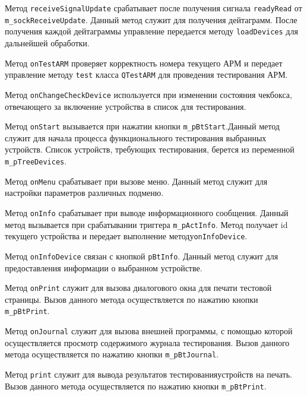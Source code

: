 \begin{enum}
	\item Метод \texttt{receiveSignalUpdate} срабатывает после получения сигнала \texttt{readyRead} от
		\texttt{m\_sockReceiveUpdate}. Данный метод служит для получения дейтаграмм. После получения каждой
		дейтаграммы управление передается методу \texttt{loadDevices} для дальнейшей обработки.

	\item Метод \texttt{onTestARM} проверяет корректность номера текущего АРМ и передает управление методу
		\texttt{test} класса \texttt{QTestARM} для проведения тестирования АРМ.

	\item Метод \texttt{onChangeCheckDevice} используется при изменении состояния чекбокса, отвечающего за включение
		устройства в список для тестирования.

	\item Метод \texttt{onStart} вызывается при нажатии кнопки \texttt{m\_pBtStart}.\break Данный метод служит для начала
		процесса функционального тестирования выбранных устройств. Список устройств, требующих тестирования,
		берется из переменной \texttt{m\_pTreeDevices}.

	\item Метод \texttt{onMenu} срабатывает при вызове меню. Данный метод служит для настройки параметров различных
		подменю.

	\item Метод \texttt{onInfo} срабатывает при выводе информационного сообщения. Данный метод вызывается при
		срабатывании триггера \texttt{m\_pActInfo}. Метод получает id текущего устройства и передает выполнение
		методу\break \texttt{onInfoDevice}.

	\item Метод \texttt{onInfoDevice} связан с кнопкой \texttt{pBtInfo}. Данный метод служит для предоставления
		информации о выбранном устройстве.

	\item Метод \texttt{onPrint} служит для вызова диалогового окна для печати тестовой страницы. Вызов данного метода
		осуществляется по нажатию кнопки \texttt{m\_pBtPrint}.

	\item Метод \texttt{onJournal} служит для вызова внешней программы, с помощью которой осуществляется просмотр
		содержимого журнала тестирования.
		Вызов данного метода осуществляется по нажатию кнопки
		\texttt{m\_pBtJournal}.

	\item Метод \texttt{print} служит для вывода результатов тестирования\break устройств на печать.
		Вызов данного метода осуществляется по нажатию кнопки
		\texttt{m\_pBtPrint}.


\end{enum}

